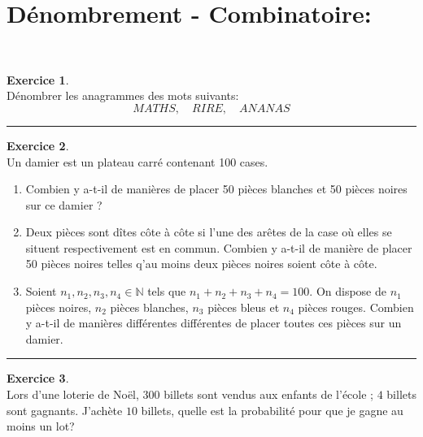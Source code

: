 \documentclass[a4paper,10pt]{article}
\theoremstyle{definition}
\theoremstyle{definition}
\newtheorem{exo}{Exercice}
\newcommand{\N}{\mathbb{N}}
\begin{document}
\section*{Dénombrement - Combinatoire:}\hfill\\[-0.25cm]
\begin{minipage}{1\linewidth}
	\begin{minipage}[t]{0.48\linewidth}
		\raggedright
		
		
		
		\begin{exo}\quad\\
			Dénombrer les anagrammes des mots suivants:
			$$MATHS, \quad RIRE,\quad ANANAS$$
			
			\centering
			\rule{1\linewidth}{0.6pt}
		\end{exo}
		
		
		
		\begin{exo}\quad\\
			Un damier est un plateau carré contenant 100 cases.
			\begin{enumerate}
				\item Combien y a-t-il de manières de placer 50 pièces blanches et 50 pièces noires sur ce damier ?
				\item Deux pièces sont dîtes côte à côte si l'une des arêtes de la case où elles se situent respectivement est en commun. Combien y a-t-il de manière de placer 50 pièces noires telles q'au moins deux pièces noires soient côte à côte. 
				\item Soient $n_1,n_2,n_3,n_4 \in\N$ tels que $n_1 + n_2 + n_3 +n_4 = 100$. On dispose de $n_1$ pièces noires, $n_2$ pièces blanches, $n_3$ pièces bleus et $n_4$ pièces rouges. Combien y a-t-il de manières différentes différentes de placer toutes ces pièces sur un damier. 
			\end{enumerate}
			\centering
			\rule{1\linewidth}{0.6pt}
		\end{exo}

		
		
		
		
	\end{minipage}	
	\hfill\vrule\hfill
	\begin{minipage}[t]{0.48\linewidth}
		\raggedright
		
		\begin{exo}\quad\\
			Lors d'une loterie de Noël, $300$ billets sont
			vendus aux enfants de l'école ; $4$ billets sont gagnants.
			J'achète $10$ billets, quelle est la probabilité pour que je gagne au moins un lot?
			

\end{exo}
\end{minipage}
\end{minipage}
\end{document}
